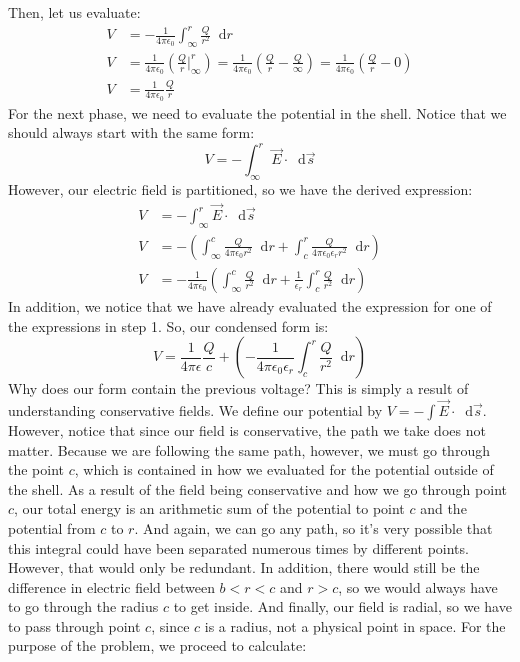 \documentclass{article}
\newcommand*\dif{\mathop{}\!\mathrm{d}}
\begin{document}
Then, let us evaluate:
\begin{align*}
V &= -\frac{1}{4\pi\epsilon_0}\int_\infty^r \frac{Q}{r^2}\dif r\\
V &= \frac{1}{4\pi\epsilon_0}\left(\frac{Q}{r} \bigg|_\infty^r\right) = \frac{1}{4\pi\epsilon_0}\left(\frac{Q}{r} - \frac{Q}{\infty}\right) = \frac{1}{4\pi\epsilon_0}\left(\frac{Q}{r}-0\right)\\
V &= \frac{1}{4\pi\epsilon_0}\frac{Q}{r}
\end{align*}
For the next phase, we need to evaluate the potential in the shell. Notice that we should always start with the same form:$$V = -\int_\infty^r \vec{E} \cdot \dif \vec{s}$$However, our electric field is partitioned, so we have the derived expression:
\begin{align*}
V &= -\int_\infty^r \vec{E} \cdot \dif \vec{s}\\
V &= -\left(\int_\infty^c \frac{Q}{4\pi\epsilon_0 r^2} \dif r + \int_c^r \frac{Q}{4\pi\epsilon_0\epsilon_r r^2} \dif r\right)\\
V &= -\frac{1}{4\pi\epsilon_0}\left(\int_\infty^c \frac{Q}{r^2}\dif r + \frac{1}{\epsilon_r} \int_c^r \frac{Q}{r^2} \dif r \right)
\end{align*}
In addition, we notice that we have already evaluated the expression for one of the expressions in step 1. So, our condensed form is:$$V = \frac{1}{4\pi\epsilon}\frac{Q}{c} + \left(-\frac{1}{4\pi\epsilon_0\epsilon_r} \int_c^r \frac{Q}{r^2} \dif r\right)$$
Why does our form contain the previous voltage? This is simply a result of understanding conservative fields. We define our potential by $V = -\int \vec{E} \cdot \dif \vec{s}$. However, notice that since our field is conservative, the path we take does not matter. Because we are following the same path, however, we must go through the point $c$, which is contained in how we evaluated for the potential outside of the shell. As a result of the field being conservative and how we go through point $c$, our total energy is an arithmetic sum of the potential to point $c$ and the potential from $c$ to $r$. And again, we can go any path, so it's very possible that this integral could have been separated numerous times by different points. However, that would only be redundant. In addition, there would still be the difference in electric field between $b<r<c$ and $r > c$, so we would always have to go through the radius $c$ to get inside. And finally, our field is radial, so we have to pass through point $c$, since $c$ is a radius, not a physical point in space. For the purpose of the problem, we proceed to calculate:
\end{document}
